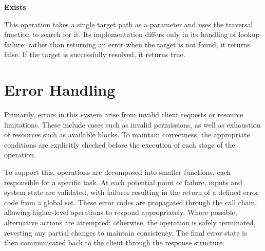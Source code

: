 \textbf{Exists}

This operation takes a single target path as a parameter and uses the traversal function to search for it. Its implementation differs only in its handling of lookup failure: rather than returning an error when the target is not found, it returns false. If the target is successfully resolved, it returns true. 

\section{Error Handling}

Primarily, errors in this system arise from invalid client requests or resource limitations. These include cases such as invalid permissions, as well as exhaustion of resources such as available blocks. To maintain correctness, the appropriate conditions are explicitly checked before the execution of each stage of the operation.

To support this, operations are decomposed into smaller functions, each responsible for a specific task. At each potential point of failure, inputs and system state are validated, with failures resulting in the return of a defined error code from a global set. These error codes are propagated through the call chain, allowing higher-level operations to respond appropriately. Where possible, alternative actions are attempted; otherwise, the operation is safely terminated, reverting any partial changes to maintain consistency. The final error state is then communicated back to the client through the response structure. 
